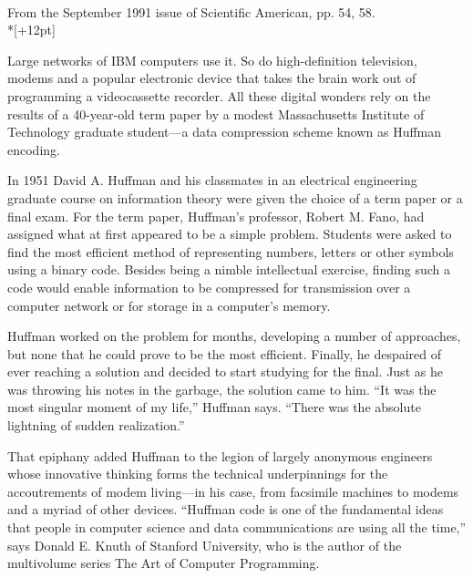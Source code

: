 \\ 
From the September 1991 issue of Scientific American, pp. 54, 58.\\*[+12pt]


Large networks of IBM computers use it. So do high-definition television, 
modems and a popular electronic device that takes the brain work out of 
programming a videocassette recorder. All these digital wonders rely on the 
results of a 40-year-old term paper by a modest Massachusetts Institute of 
Technology graduate student---a data compression scheme known as Huffman encoding.

In 1951 David A. Huffman and his classmates in an electrical engineering 
graduate course on information theory were given the choice of a term paper 
or a final exam. For the term paper, Huffman's professor, Robert M. Fano, 
had assigned what at first appeared to be a simple problem. Students were 
asked to find the most efficient method of representing numbers, letters 
or other symbols using a binary code. Besides being a nimble intellectual 
exercise, finding such a code would enable information to be compressed for 
transmission over a computer network or for storage in a computer's memory.

Huffman worked on the problem for months, developing a number of approaches, 
but none that he could prove to be the most efficient. Finally, he despaired 
of ever reaching a solution and decided to start studying for the final. 
Just as he was throwing his notes in the garbage, the solution came to him. 
``It was the most singular moment of my life,'' Huffman says. ``There was the 
absolute lightning of sudden realization.''

That epiphany added Huffman to the legion of largely anonymous engineers 
whose innovative thinking forms the technical underpinnings for the accoutrements 
of modem living---in his case, from facsimile machines to modems and a myriad 
of other devices. ``Huffman code is one of the fundamental ideas that people 
in computer science and data communications are using all the time,'' says 
Donald E. Knuth of Stanford University, who is the author of the multivolume 
series The Art of Computer Programming.

